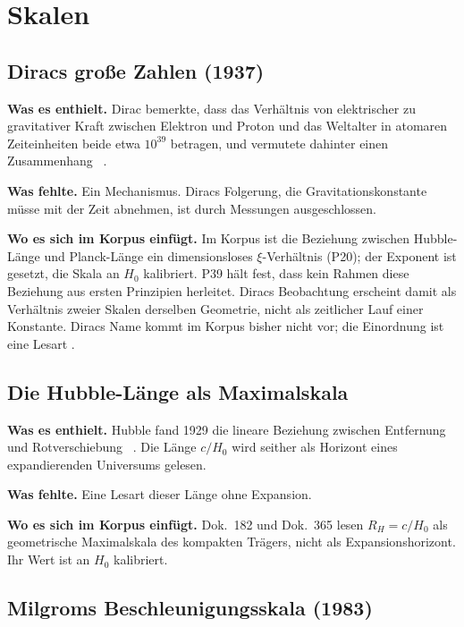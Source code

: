 \section{Skalen}

\subsection{Diracs große Zahlen (1937)}

\textbf{Was es enthielt.} Dirac bemerkte, dass das Verhältnis von elektrischer zu gravitativer
Kraft zwischen Elektron und Proton und das Weltalter in atomaren Zeiteinheiten beide etwa $10^{39}$
betragen, und vermutete dahinter einen Zusammenhang \QM~\cite{Dirac1937}.

\textbf{Was fehlte.} Ein Mechanismus. Diracs Folgerung, die Gravitationskonstante müsse mit der Zeit
abnehmen, ist durch Messungen ausgeschlossen.

\textbf{Wo es sich im Korpus einfügt.} Im Korpus ist die Beziehung zwischen Hubble-Länge und
Planck-Länge ein dimensionsloses $\xi$-Verhältnis (P20); der Exponent ist gesetzt, die Skala an
$H_0$ kalibriert. P39 hält fest, dass kein Rahmen diese Beziehung aus ersten Prinzipien herleitet.
Diracs Beobachtung erscheint damit als Verhältnis zweier Skalen derselben Geometrie, nicht als
zeitlicher Lauf einer Konstante. Diracs Name kommt im Korpus bisher nicht vor; die Einordnung ist
eine Lesart \SM.

\subsection{Die Hubble-Länge als Maximalskala}

\textbf{Was es enthielt.} Hubble fand 1929 die lineare Beziehung zwischen Entfernung und
Rotverschiebung \QM~\cite{Hubble1929}. Die Länge $c/H_0$ wird seither als Horizont eines
expandierenden Universums gelesen.

\textbf{Was fehlte.} Eine Lesart dieser Länge ohne Expansion.

\textbf{Wo es sich im Korpus einfügt.} Dok.~182 und Dok.~365 lesen $R_H=c/H_0$ als geometrische
Maximalskala des kompakten Trägers, nicht als Expansionshorizont. Ihr Wert ist an $H_0$ kalibriert.

\subsection{Milgroms Beschleunigungsskala (1983)}

